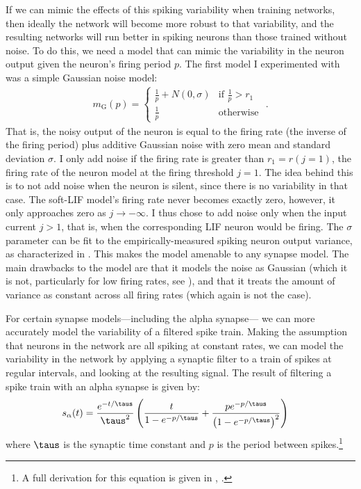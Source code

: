 If we can mimic the effects of this spiking variability when training networks,
then ideally the network will become more robust to that variability,
and the resulting networks will run better in spiking neurons
than those trained without noise.
To do this, we need a model that can mimic the variability
in the neuron output given the neuron's firing period $p$.
The first model I experimented with was a simple Gaussian noise model:
\newcommand{\mgauss}{m_\text{G}}
\begin{align}
  \mgauss(p) = \begin{cases}
    \frac{1}{p} + N(0, \sigma) & \text{if } \frac{1}{p} > r_1 \\
    \frac{1}{p}                & \text{otherwise}
  \end{cases} \text{ .}
\end{align}
That is, the noisy output of the neuron is equal to the firing rate
(the inverse of the firing period)
plus additive Gaussian noise with zero mean and standard deviation $\sigma$.
I only add noise if the firing rate is greater than $r_1 = r(j=1)$,
the firing rate of the neuron model at the firing threshold $j = 1$.
The idea behind this is to not add noise when the neuron is silent,
since there is no variability in that case.
The soft-LIF model's firing rate never becomes exactly zero, however,
it only approaches zero as $j \to -\infty$.
I thus chose to add noise only when the input current $j > 1$,
that is, when the corresponding LIF neuron would be firing.
The $\sigma$ parameter can be fit to the empirically-measured
spiking neuron output variance, as characterized in .
This makes the model amenable to any synapse model.
The main drawbacks to the model are that it models the noise as Gaussian
(which it is not, particularly for low firing rates, see ),
and that it treats the amount of variance as constant across all firing rates
(which again is not the case).

For certain synapse models---including the alpha synapse---%
we can more accurately model the variability of a filtered spike train.
Making the assumption that neurons in the network
are all spiking at constant rates,
we can model the variability in the network
by applying a synaptic filter to a train of spikes at regular intervals,
and looking at the resulting signal.
The result of filtering a spike train with an alpha synapse is given by:
\newcommand{\salpha}{s_\alpha}
\newcommand{\malpha}{m_\alpha}
\begin{align}
  \salpha(t) &= \frac{e^{-t/\taus}}{\taus^2} \left(
    \frac{t}{1 - e^{-p/\taus}} + \frac{p e^{-p/\taus}}{\left(1 - e^{-p/\taus}\right)^2} \right)
  \eqnlabel{alpha-model}
\end{align}
where $\taus$ is the synaptic time constant
and $p$ is the period between spikes.\footnote{
  A full derivation for this equation is given in ,
  .}

